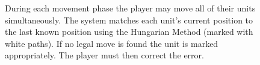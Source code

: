 \documentclass[review]{vgtc}                 %
\begin{document}
\begin{figure}[t]
%
\vspace{-0.1in}
\caption{During each movement phase the player may move all of their
  units simultaneously.  The system matches each unit's current
  position to the last known position using the Hungarian Method
  (marked with white paths).  If no legal move is found the unit is
  marked appropriately.  The player must then correct the error.
}
\vspace{-0.15in}
\label{FIGURE:MovementSequence}
\end{figure}
\end{document}
